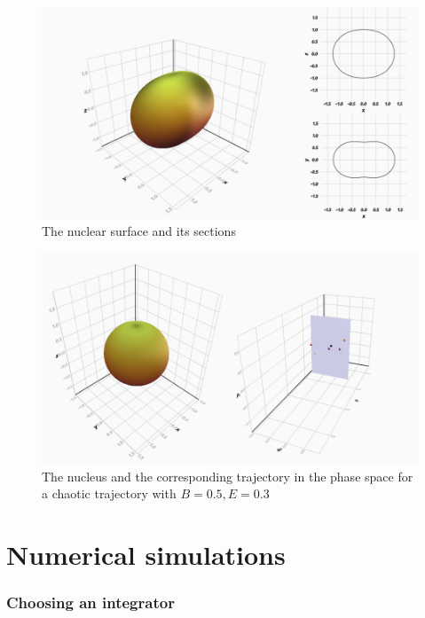 \documentclass{beamer}
\begin{document}
\begin{frame}
	\begin{figure}
		\includegraphics[width=\textwidth]{nucleus-with-sections}
		\caption{The nuclear surface and its sections}
	\end{figure}
\end{frame}


\begin{frame}
	\begin{figure}
		\includegraphics[width=\textwidth]{nucleus-with-poincare}
		\caption{The nucleus and the corresponding trajectory in the phase space
		for a chaotic trajectory with \(B=0.5, E=0.3\)}
	\end{figure}
\end{frame}

\section{Numerical simulations}

\subsubsection{Choosing an integrator}
\end{document}
